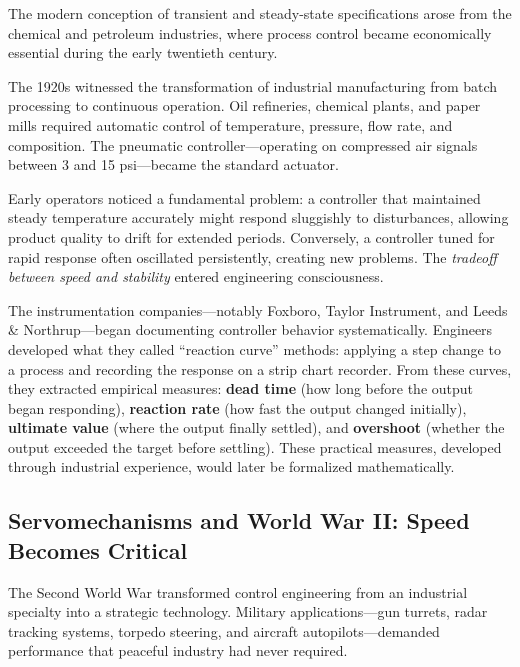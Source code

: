 \begin{historicalbox}
The modern conception of transient and steady-state specifications arose from the chemical and petroleum industries, where process control became economically essential during the early twentieth century.
\end{historicalbox}

The 1920s witnessed the transformation of industrial manufacturing from batch processing to continuous operation. Oil refineries, chemical plants, and paper mills required automatic control of temperature, pressure, flow rate, and composition. The pneumatic controller---operating on compressed air signals between 3 and 15 psi---became the standard actuator.

Early operators noticed a fundamental problem: a controller that maintained steady temperature accurately might respond sluggishly to disturbances, allowing product quality to drift for extended periods. Conversely, a controller tuned for rapid response often oscillated persistently, creating new problems. The \textit{tradeoff between speed and stability} entered engineering consciousness.

The instrumentation companies---notably Foxboro, Taylor Instrument, and Leeds \& Northrup---began documenting controller behavior systematically. Engineers developed what they called ``reaction curve'' methods: applying a step change to a process and recording the response on a strip chart recorder. From these curves, they extracted empirical measures: \textbf{dead time} (how long before the output began responding), \textbf{reaction rate} (how fast the output changed initially), \textbf{ultimate value} (where the output finally settled), and \textbf{overshoot} (whether the output exceeded the target before settling). These practical measures, developed through industrial experience, would later be formalized mathematically.

\subsection{Servomechanisms and World War II: Speed Becomes Critical}

The Second World War transformed control engineering from an industrial specialty into a strategic technology. Military applications---gun turrets, radar tracking systems, torpedo steering, and aircraft autopilots---demanded performance that peaceful industry had never required.

